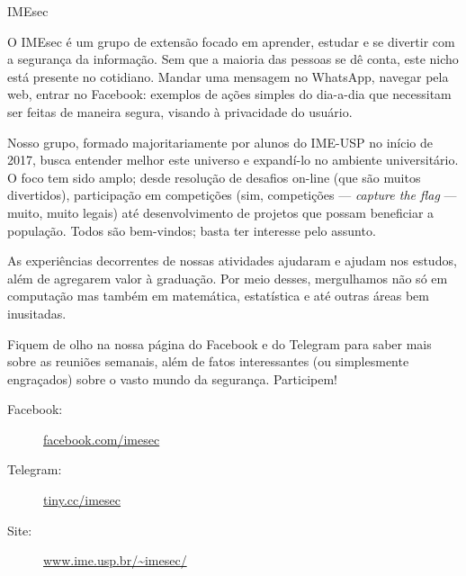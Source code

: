 \begin{subsecao}{IMEsec}


O IMEsec é um grupo de extensão focado em aprender, estudar e se divertir com a
segurança da informação. Sem que a maioria das pessoas se dê conta, este nicho
está presente no cotidiano. Mandar uma mensagem no WhatsApp, navegar pela web,
entrar no Facebook: exemplos de ações simples do dia-a-dia que necessitam ser
feitas de maneira segura, visando à privacidade do usuário.

Nosso grupo, formado majoritariamente por alunos do IME-USP no início de 2017,
busca entender melhor este universo e expandí-lo no ambiente universitário. O
foco tem sido amplo; desde resolução de desafios on-line (que são muitos
divertidos), participação em competições (sim, competições — \textit{capture the
flag} — muito, muito legais) até desenvolvimento de projetos que possam
beneficiar a população. Todos são bem-vindos; basta ter interesse pelo assunto.

As experiências decorrentes de nossas atividades ajudaram e ajudam nos estudos,
além de agregarem valor à graduação. Por meio desses, mergulhamos não só em
computação mas também em matemática, estatística e até outras áreas bem
inusitadas.

Fiquem de olho na nossa página do Facebook e do Telegram para saber mais sobre
as reuniões semanais, além de fatos interessantes (ou simplesmente engraçados)
sobre o vasto mundo da segurança. Participem!

\begin{description}
  \item[Facebook:] \url{facebook.com/imesec}
  \item[Telegram:] \url{tiny.cc/imesec}
  \item[Site:] \url{www.ime.usp.br/~imesec/}
\end{description}

\end{subsecao}
